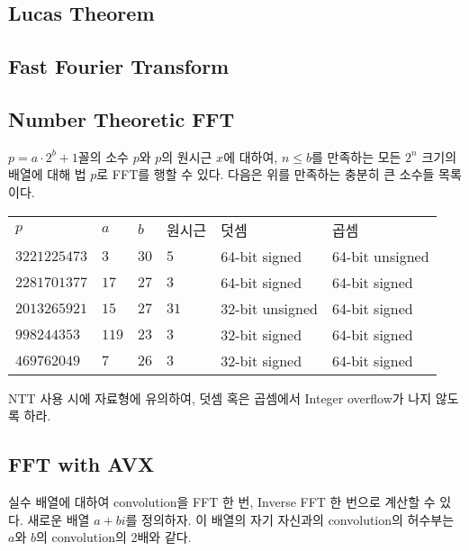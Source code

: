 \documentclass[10pt,landscape,a4paper,twocolumn]{article}
\begin{document}
\subsection{Lucas Theorem}


\subsection{Fast Fourier Transform}


\subsection{Number Theoretic FFT}

$p = a \cdot 2^b + 1$꼴의 소수 $p$와 $p$의 원시근 $x$에 대하여, $n \leq b$를 만족하는
모든 $2^n$ 크기의 배열에 대해 법 $p$로 FFT를 행할 수 있다.
다음은 위를 만족하는 충분히 큰 소수들 목록이다.

\begin{table}[!htbp]
\begin{tabular}{llllll}
$p$ & $a$ & $b$ & 원시근 & 덧셈 & 곱셈 \\
$3221225473$ & $3$ & $30$ & $5$ & 64-bit signed & 64-bit unsigned \\
$2281701377$ & $17$ & $27$ & $3$ & 64-bit signed & 64-bit signed \\
$2013265921$ & $15$ & $27$ & $31$ & 32-bit unsigned & 64-bit signed \\
$998244353$ & $119$ & $23$ & $3$ & 32-bit signed & 64-bit signed \\
$469762049$ & $7$ & $26$ & $3$ & 32-bit signed & 64-bit signed \\
\end{tabular}
\end{table}

NTT 사용 시에 자료형에 유의하여, 덧셈 혹은 곱셈에서 Integer overflow가 나지 않도록 하라.



\subsection{FFT with AVX}

실수 배열에 대하여 convolution을 FFT 한 번, Inverse FFT 한 번으로 계산할 수 있다.
새로운 배열 $a + bi$를 정의하자. 이 배열의 자기 자신과의 convolution의 허수부는
$a$와 $b$의 convolution의 2배와 같다.
\end{document}
